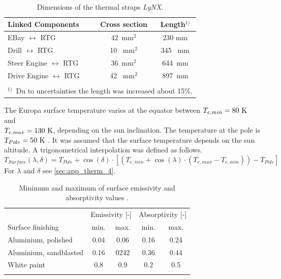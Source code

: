 \begin{table}[H]
	\centering
	\caption{Dimensions of the thermal straps \textit{LyNX}\textsuperscript{\tiny\textregistered}.}
	\begin{tabular}{l@{\quad}cc}
		\toprule
		Linked Components & Cross section  & Length$^{1)}$  \\ \midrule
		EBay $\leftrightarrow$ RTG & 42\ mm$^2$ & 230 mm  \\[0.25em] 
		Drill $\leftrightarrow$ RTG &10 \ mm$^2$ &345 \ mm \\[0.25em] 
		Steer Engine $\leftrightarrow$ RTG & 36\ mm$^2$&644\ mm  \\[0.25em] 
		Drive Engine $\leftrightarrow$ RTG &42 \ mm$^2$&897\ mm  \\[0.25em] \bottomrule
		& &   \\[-0.5em]
		\multicolumn{3}{l}{$^{1)}$\ Du to uncertainties the length was increased about 15\%.}\\[1em]
	\end{tabular}
	\label{tab:tcs_lynx}
\end{table}

The Europa surface temperature varies at the  equator between $T_{e,min}=80~{\rm K}$ and\\ $T_{e,max}=130~{\rm K}$, depending on the sun inclination.
The temperature at the pole is ${T_{Pole}=50~{\rm K}}$ \cite{Europa}.
It was assumed that the surface temperature depends on the sun altitude.
A trigonometrical interpolation was defined as follows.
\[ T_{Surface}(\lambda, \delta) = T_{Pole} + \cos (\delta) \cdot [(T_{e,min}+\cos (\lambda)\cdot (T_{e,max}-T_{e,min}))-T_{Pole}] \]
For $\lambda$ and $\delta$ see \autoref{sec:app_therm_4}.\\

\begin{table}[H]
	\centering
	\caption{Minimum and maximum of surface emissivity and absorptivity values \cite{ref_tcs_05}.}
	\begin{tabular}{l@{\qquad\qquad}cc@{\qquad\qquad}cc}
		\toprule
		& \multicolumn{2}{l}{Emissivity [-]} & \multicolumn{2}{l}{Absorptivity [-]}  \\ 
		Surface finishing	&	min. & max. 	&	min. & max.   \\\midrule
		Aluminium, polished &0.04 &0.06  & 0.16& 0.24   \\
		Aluminium, sandblasted & 0.16&0242  &0.36 & 0.44   \\
		White paint & 0.8 & 0.9 & 0.2 & 0.5  \\ \bottomrule
		& & & & \\
	\end{tabular}
	\label{tab:tcs_surface}
\end{table}



